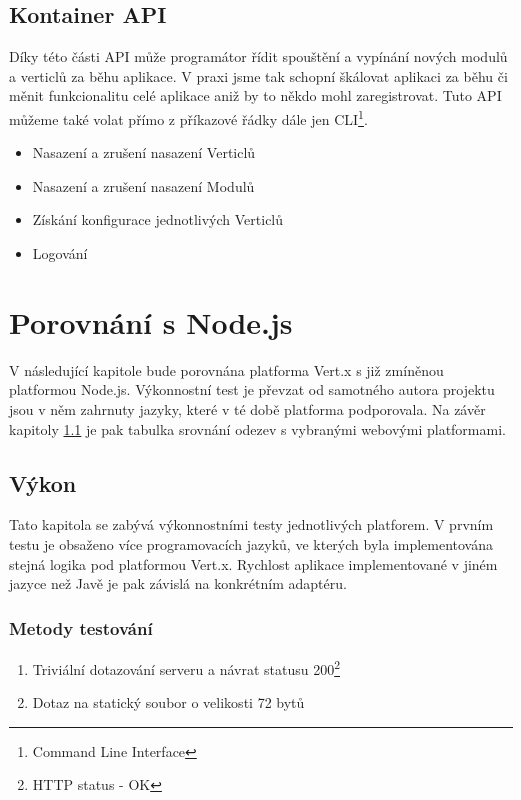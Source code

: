 \subsection{Kontainer API}

Díky této části API může programátor řídit spouštění a vypínání nových modulů a verticlů za běhu aplikace. V praxi jsme tak schopní škálovat aplikaci za běhu či měnit funkcionalitu celé aplikace aniž by to někdo mohl zaregistrovat. Tuto API můžeme také volat přímo z příkazové řádky dále jen CLI\footnote{Command Line Interface}.

\begin{itemize}
\item{Nasazení a zrušení nasazení Verticlů}
\item{Nasazení a zrušení nasazení Modulů}
\item{Získání konfigurace jednotlivých Verticlů}
\item{Logování}
\end{itemize}

\section{Porovnání s Node.js}

V následující kapitole bude porovnána platforma Vert.x s již zmíněnou platformou Node.js. Výkonnostní test\cite{benchmarkTim} je převzat od samotného autora projektu jsou v něm zahrnuty jazyky, které v té době platforma podporovala. Na závěr kapitoly \ref{sub:performence} je pak tabulka srovnání\cite{benchmark} odezev s vybranými webovými platformami.

\subsection{Výkon}\label{sub:performence}

Tato kapitola se zabývá výkonnostními testy jednotlivých platforem. V prvním testu je obsaženo více programovacích jazyků, ve kterých byla implementována stejná logika pod platformou Vert.x. Rychlost aplikace implementované v jiném jazyce než Javě je pak závislá na konkrétním adaptéru.

\subsubsection{Metody testování}

\begin{enumerate}
\item{Triviální dotazování serveru a návrat statusu 200\footnote{HTTP status - OK}}
\item{Dotaz na statický soubor o velikosti 72 bytů}
\end{enumerate}


